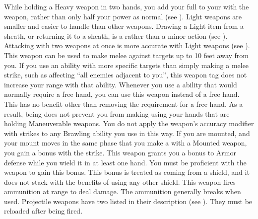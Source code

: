     While holding a Heavy weapon in two hands, you add your full  to your  with the weapon, rather than only half your power as normal (see ).
     Light weapons are smaller and easier to handle than other weapons.
    Drawing a Light item from a sheath, or returning it to a sheath, is a  rather than a minor action (see ).
    Attacking with two weapons at once is more accurate with Light weapons (see ).
    \label{Long Weapon} This weapon can be used to make melee  against targets up to 10 feet away from you.
    If you use an ability with more specific targets than simply making a melee strike, such as affecting ``all enemies adjacent to you'', this weapon tag does not increase your range with that ability.
     Whenever you use a \atBrawling ability that would normally require a free hand, you can use this weapon instead of a free hand.
    This has no benefit other than removing the requirement for a free hand.
    As a result, being \grappled does not prevent you from making  using your hands that are holding Maneuverable weapons.
    You do not apply the weapon's accuracy modifier with strikes to any Brawling ability you use in this way.
    \label{Mounted Weapon} If you are mounted, and your mount moves in the same phase that you make a  with a Mounted weapon, you gain a   bonus with the strike.
     This weapon grants you a  bonus to Armor defense while you wield it in at least one hand.
    You must be proficient with the weapon to gain this bonus.
    This bonus is treated as coming from a shield, and it does not stack with the benefits of using any other shield.
     This weapon fires ammunition at range to deal damage.
    The ammunition generally breaks when used.
    Projectile weapons have two  listed in their description (see ).
    They must be reloaded after being fired.
